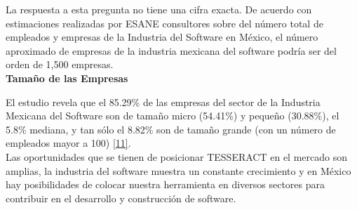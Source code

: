 La respuesta a esta pregunta no tiene una cifra exacta. De acuerdo con estimaciones realizadas por ESANE consultores sobre del número total de empleados y empresas de la Industria del Software en México, el número aproximado de empresas de la industria mexicana del software podría ser del orden de 1,500 empresas.\\

\textbf{Tamaño de las Empresas}

El estudio revela que el 85.29\% de las empresas del sector de la Industria Mexicana del Software son de tamaño micro (54.41\%) y pequeño (30.88\%), el 5.8\% mediana, y tan sólo el 8.82\% son de tamaño grande (con un número de empleados mayor a 100) \hyperlink{b11}{[11]}.\\

Las oportunidades que se tienen de posicionar TESSERACT en el mercado son amplias, la industria del software muestra un constante crecimiento y en México hay posibilidades de colocar nuestra herramienta en diversos sectores para contribuir en el desarrollo y construcción de software. 